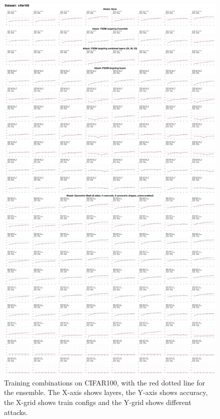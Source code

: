 \documentclass[a4paper, oneside]{discothesis}
\begin{document}
\begin{figure}
	\centering
	\includegraphics[width=\textwidth,height=\textheight,keepaspectratio]{figures/self_ensemble_8train_cifar100.pdf}
	\caption{Training combinations on CIFAR100, with the red dotted line for the ensemble. The X-axis shows layers, the Y-axis shows accuracy, the X-grid shows train configs and the Y-grid shows different attacks.}
	\label{fig:8train-cifar100}
\end{figure}
\end{document}
